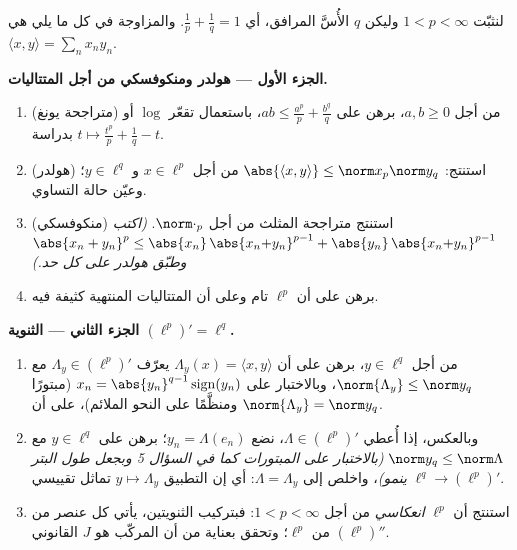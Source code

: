 \begin{problem}[{مسألة نهاية الأسبوع --- $(\ell^p)' = \ell^q$، والانعكاسية،
وغرابة $\ell^\infty$}]
\label{pb:b3:banach:1}
لنثبّت $1 < p < \infty$ وليكن $q$ الأُسَّ المرافق، أي $\frac1p + \frac1q = 1$.
والمزاوجة في كل ما يلي هي $\langle x,
y\rangle = \sum_n x_ny_n$.

\medskip
\noindent\textbf{الجزء الأول --- هولدر ومنكوفسكي من أجل
المتتاليات.}
\begin{enumerate}
  \item (متراجحة يونغ) من أجل $a, b \geq 0$، برهن على $ab \leq
        \frac{a^p}p + \frac{b^q}q$،
        باستعمال تقعّر $\log$ أو بدراسة $t \mapsto \frac{t^p}p + \frac1q - t$.
  \item (هولدر) استنتج: $\abs{\langle x, y\rangle} \leq
        \norm x_p\norm y_q$ من أجل $x \in \ell^p$
        و $y \in \ell^q$؛ وعيّن حالة التساوي.
  \item (منكوفسكي) استنتج متراجحة المثلث من أجل $\norm\cdot_p$.
        \emph{(اكتب $\abs{x_n + y_n}^p \leq
        \abs{x_n}\,\abs{x_n{+}y_n}^{p-1} +
        \abs{y_n}\,\abs{x_n{+}y_n}^{p-1}$ وطبّق هولدر على كل حد.)}
  \item برهن على أن $\ell^p$ تام وعلى أن المتتاليات المنتهية
        كثيفة فيه.
\end{enumerate}

\medskip
\noindent\textbf{الجزء الثاني --- الثنوية $(\ell^p)' =
\ell^q$.}
\begin{enumerate}[resume]
  \item من أجل $y \in \ell^q$، برهن على أن $\Lambda_y(x) = \langle
        x, y\rangle$ يعرّف $\Lambda_y \in (\ell^p)'$
        مع $\norm{\Lambda_y} \leq \norm y_q$، وبالاختبار على
        $x_n = \abs{y_n}^{q-1}\operatorname{sign}(y_n)$
        (مبتورًا ومنظَّمًا على النحو الملائم)، على أن $\norm{\Lambda_y} = \norm y_q$.
  \item وبالعكس، إذا أُعطي $\Lambda \in (\ell^p)'$، نضع $y_n =
        \Lambda(e_n)$؛ برهن على
        $y \in \ell^q$ مع $\norm y_q \leq
        \norm\Lambda$ \emph{(بالاختبار على المبتورات
        كما في السؤال 5 وبجعل طول البتر ينمو)}، واخلص إلى
        $\Lambda = \Lambda_y$: أي إن التطبيق $y \mapsto \Lambda_y$ تماثل تقييسي $\ell^q \to (\ell^p)'$.
  \item استنتج أن $\ell^p$ \emph{انعكاسي} من أجل $1 < p <
        \infty$:
        فبتركيب الثنويتين، يأتي كل عنصر من $(\ell^p)''$ من
        $\ell^p$؛ وتحقق بعناية من أن المركّب هو $J$ القانوني.
\end{enumerate}


\end{problem}
